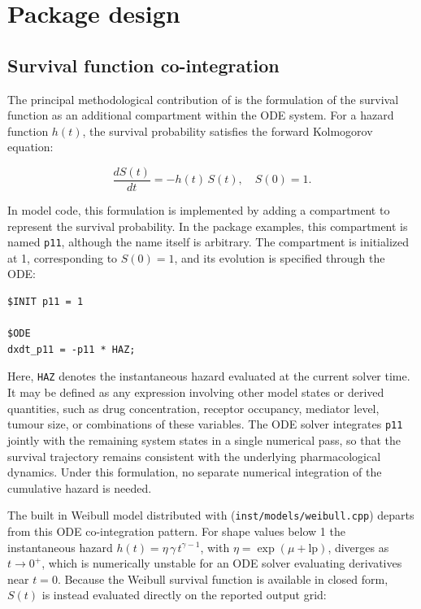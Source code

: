 \section{Package design}\label{package-design}

\subsection{Survival function co-integration}\label{survival-function-co-integration}

The principal methodological contribution of  is the formulation of the survival function as an additional compartment within the ODE system. For a hazard function \(h(t)\), the survival probability satisfies the forward Kolmogorov equation:

\[\frac{dS(t)}{dt} = -h(t)\, S(t), \quad S(0) = 1.\]

In  model code, this formulation is implemented by adding a compartment to represent the survival probability. In the package examples, this compartment is named \texttt{p11}, although the name itself is arbitrary. The compartment is initialized at 1, corresponding to \(S(0) = 1\), and its evolution is specified through the ODE:

\begin{verbatim}
$INIT p11 = 1

$ODE
dxdt_p11 = -p11 * HAZ;
\end{verbatim}

Here, \texttt{HAZ} denotes the instantaneous hazard evaluated at the current solver time. It may be defined as any expression involving other model states or derived quantities, such as drug concentration, receptor occupancy, mediator level, tumour size, or combinations of these variables. The ODE solver integrates \texttt{p11} jointly with the remaining system states in a single numerical pass, so that the survival trajectory remains consistent with the underlying pharmacological dynamics. Under this formulation, no separate numerical integration of the cumulative hazard is needed.

The built in Weibull model distributed with  (\texttt{inst/models/weibull.cpp}) departs from this ODE co-integration pattern. For shape values below 1 the instantaneous hazard \(h(t) = \eta\,\gamma\,t^{\gamma-1}\), with \(\eta = \exp(\mu + \text{lp})\), diverges as \(t \to 0^+\), which is numerically unstable for an ODE solver evaluating derivatives near \(t = 0\). Because the Weibull survival function is available in closed form, \(S(t)\) is instead evaluated directly on the reported output grid:


